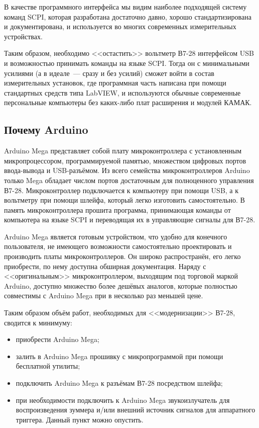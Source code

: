 \documentclass[12pt, a4paper]{article}
\newcommand{\SCPI}{\mbox{SCPI}}
\newcommand{\V}{\mbox{В7-28}}
\newcommand{\Arduino}{Arduino Mega}
\begin{document}
В качестве программного интерфейса мы видим наиболее подходящей систему команд \SCPI, которая разработана достаточно давно, хорошо стандартизирована и документирована, и используется во многих современных измерительных устройствах.

Таким образом, необходимо <<остастить>> вольтметр \V{} интерфейсом USB и возможностью принимать команды на языке \SCPI. Тогда он с минимальными усилиями (а в идеале~--- сразу и без усилий) сможет войти в состав измерительных установок, где программная часть написана при помощи стандартных средств типа LabVIEW, и используются обычные современные персональные компьютеры без каких-либо плат расширения и модулей КАМАК.

\subsection{Почему Arduino}

\Arduino{} представляет собой плату микроконтроллера с установленным микропроцессором, программируемой памятью, множеством цифровых портов ввода-вывода и USB-разъёмом. Из всего семейства микроконтроллеров Arduino только Mega обладает числом портов достаточным для полноценного управления \V. Микроконтроллер подключается к компьютеру при помощи USB, а к вольтметру при помощи шлейфа, который легко изготовить самостоятельно.  В память микроконтроллера прошита программа, принимающая команды от компьютера на языке \SCPI{} и переводящая их в управляющие сигналы для \V.

\Arduino{} является готовым устройством, что удобно для конечного пользователя, не имеющего возможности самостоятельно проектировать и производить платы микроконтроллеров. Он широко распространён, его легко приобрести, по нему доступна обширная документация. Наряду с <<оригинальным>> микроконтроллером, выходящим под торговой маркой Arduino, доступно множество более дешёвых аналогов, которые полностью совместимы с \Arduino{} при в несколько раз меньшей цене.

Таким образом объём работ, необходимых для <<модернизации>> \V{}, сводится к минимуму:

\begin{itemize}
\item приобрести \Arduino{};
\item залить в \Arduino{} прошивку с микропрограммой при помощи бесплатной утилиты;
\item подключить \Arduino{} к разъёмам \V{} посредством шлейфа;
\item при необходимости подключить к \Arduino{} звукоизлучатель для воспроизведения зуммера и/или внешний источник сигналов для аппаратного триггера. Данный пункт можно опустить.
\end{itemize}
\end{document}
